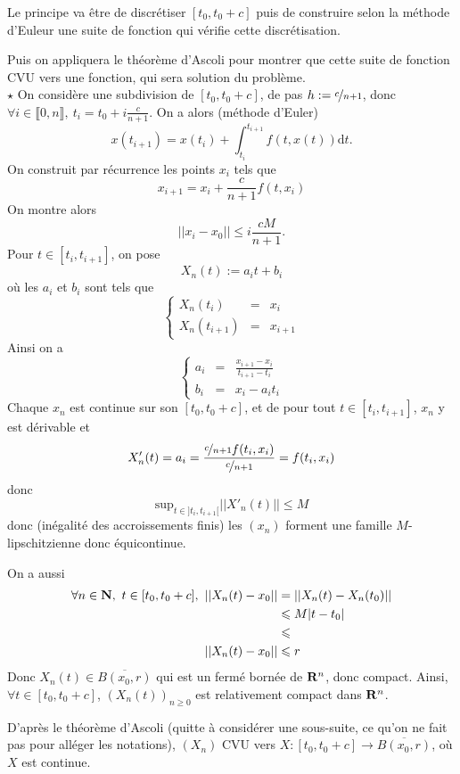 \documentclass[a4paper,11pt, twoside]{article}
\begin{document}
\begin{Proof}
  Le principe va être de discrétiser $[t_0,t_0+c]$ puis de construire selon la méthode d'Euleur une suite de fonction qui vérifie cette discrétisation.

  Puis on appliquera le théorème d'Ascoli pour montrer que cette suite de fonction CVU vers une fonction, qui sera solution du problème.\\

  $\star$ On considère une subdivision de $[t_0,t_0+c]$, de pas $h:=\nicefrac{c}{n+1}$, donc $\forall i\in\llbracket 0,n\rrbracket,\ t_i=t_0+i\frac{c}{n+1}$. On a alors (méthode d'Euler)
  $$x(t_{i+1})=x(t_i)+\int_{t_i}^{t_{i+1}}f(t,x(t))\mathrm dt.$$
  On construit par récurrence les points $x_i$ tels que 
  $$x_{i+1}=x_i+\frac{c}{n+1}f(t,x_i)$$
  On montre alors 
  $$||x_i-x_0||\leqslant i\frac{cM}{n+1}.$$
  Pour $t\in[t_i,t_{i+1}]$, on pose 
  $$X_n(t):=a_it+b_i$$
  où les $a_i$ et $b_i$ sont tels que 
  $$\left\{\begin{array}{ccl}
    X_n(t_i)&=&x_i\\
    X_n(t_{i+1})&=&x_{i+1}
  \end{array}\right.$$
  Ainsi on a 
  $$\left\{\begin{array}{ccl}
    \displaystyle a_i&=&\frac{x_{i+1}-x_i}{t_{i+1}-t_i}\\
    b_i&=&x_i-a_i t_i
  \end{array}\right.$$
  Chaque $x_n$ est continue sur son $[t_0,t_0+c]$, et de pour tout $t\in [t_i,t_{i+1}]$, $x_n$ y est dérivable et 
  $$X'_n(t)=a_i=\frac{\nicefrac{c}{n+1}f(t_i,x_i)}{\nicefrac{c}{n+1}}=f(t_i,x_i)$$
  donc 
  $$\mathrm{sup}_{t\in]t_i,t_{i+1}[}||X'_n(t)||\leqslant M$$
  donc (inégalité des accroissements finis) les $(x_n)$ forment une famille $M$-lipschitzienne donc équicontinue.

  On a aussi
  \begin{align*}
    \forall n\in\N,\ t\in [t_0,t_0+c],\ ||X_n(t)-x_0||&=||X_n(t)-X_n(t_0)||\\
    &\leqslant M|t-t_0|\\
    &\leqslant \\
    ||X_n(t)-x_0||&\leqslant r\\
  \end{align*}
  Donc $X_n(t)\in\overline{B(x_0,r)}$ qui est un fermé bornée de $\mathbf R^n$, donc compact. Ainsi, $\forall t\in [t_0,t_0+c]$, $\left(X_n(t)\right)_{n\geqslant 0}$ est relativement compact dans $\mathbf R^n$.

  D'après le théorème d'Ascoli (quitte à considérer une sous-suite, ce qu'on ne fait pas pour alléger les notations), $(X_n)$ CVU vers $X:[t_0,t_0+c]\longrightarrow\overline{B(x_0,r)}$, où $X$ est continue.


\end{Proof}
\end{document}
